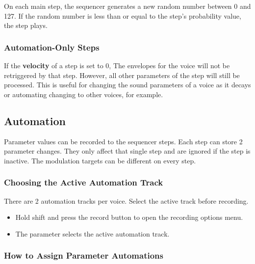 On each main step, the sequencer generates a new random number between 0
and 127. If the random number is less than or equal to the step's
probability value, the step plays.


\subsubsection{Automation-Only Steps}\label{automation-only-steps}

If the \textbf{velocity} of a step is set to 0, The envelopes for the
voice will not be retriggered by that step. However, all other
parameters of the step will still be processed. This is useful for
changing the sound parameters of a voice as it decays or automating
changing to other voices, for example.

\subsection{Automation}\label{automation}

Parameter values can be recorded to the sequencer steps. Each step can
store 2 parameter changes. They only affect that single step and are
ignored if the step is inactive. The modulation targets can be different
on every step.

\subsubsection{Choosing the Active Automation
Track}\label{choosing-the-active-automation-track}

There are 2 automation tracks per voice. Select the active track before
recording.

\begin{itemize}
\tightlist
\item
  Hold shift and press the record button to open the recording options
  menu.
\item
  The  parameter selects the active automation track.
\end{itemize}

\subsubsection{How to Assign Parameter
Automations}\label{how-to-assign-parameter-automations}

